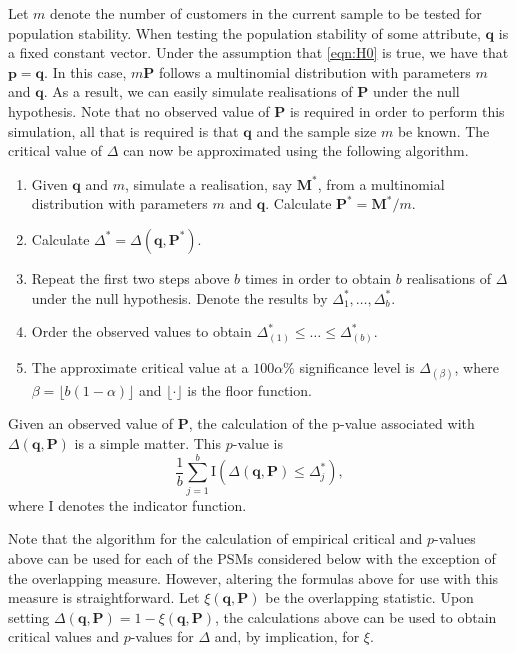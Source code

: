 \documentclass{article}
\theoremstyle{def}
\begin{document}
Let $m$ denote the number of customers in the current sample to be tested for population stability. When testing the population stability of some attribute, $\mathbf{q}$ is a fixed constant vector. Under the assumption that \eqref{eqn:H0} is true, we have that $\mathbf{p}=\mathbf{q}$. In this case, $m\mathbf{P}$ follows a multinomial distribution with parameters $m$ and $\mathbf{q}$. As a result, we can easily simulate realisations of $\mathbf{P}$ under the null hypothesis. Note that no observed value of $\mathbf{P}$ is required in order to perform this simulation, all that is required is that $\mathbf{q}$ and the sample size $m$ be known. The critical value of $\Delta$ can now be approximated using the following algorithm.
\begin{enumerate}
\item Given $\mathbf{q}$ and $m$, simulate a realisation, say $\mathbf{M}^*$, from a multinomial distribution with parameters $m$ and $\mathbf{q}$. Calculate $\mathbf{P}^*=\mathbf{M}^*/m$. 
\item Calculate $\Delta^*=\Delta(\mathbf{q},\mathbf{P}^*)$.
\item Repeat the first two steps above $b$ times in order to obtain $b$ realisations of $\Delta$ under the null hypothesis. Denote the results by $\Delta_1^*,\ldots,\Delta^*_{b}$.
\item Order the observed values to obtain $\Delta^*_{(1)} \leq \dots \leq \Delta^*_{(b)}$.
\item The approximate critical value at a $100\alpha \%$ significance level is $\Delta_{(\beta)}$, where $\beta=\lfloor b(1-\alpha) \rfloor$ and $\lfloor \cdot \rfloor$ is the floor function.
\end{enumerate}
Given an observed value of $\mathbf{P}$, the calculation of the p-value associated with $\Delta(\mathbf{q},\mathbf{P})$ is a simple matter. This $p$-value is
\begin{equation*}
    \frac{1}{b} \sum_{j=1}^b \textrm{I}\left(\Delta(\mathbf{q},\mathbf{P}) \leq \Delta^*_{j}\right),
\end{equation*}
where $\textrm{I}$ denotes the indicator function.

Note that the algorithm for the calculation of empirical critical and $p$-values above can be used for each of the PSMs considered below with the exception of the overlapping measure. However, altering the formulas above for use with this measure is straightforward. Let $\xi(\mathbf{q},\mathbf{P})$ be the overlapping statistic. Upon setting $\Delta(\mathbf{q},\mathbf{P})=1-\xi(\mathbf{q},\mathbf{P})$, the calculations above can be used to obtain critical values and $p$-values for $\Delta$ and, by implication, for $\xi$.
\end{document}
